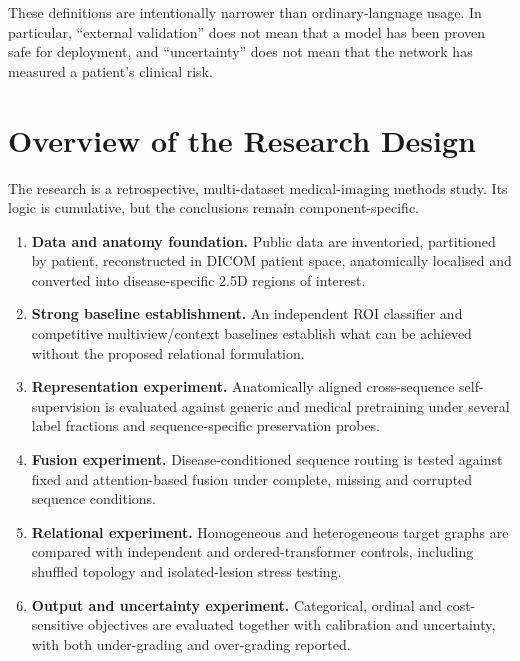 These definitions are intentionally narrower than ordinary-language usage. In
particular, ``external validation'' does not mean that a model has been proven safe
for deployment, and ``uncertainty'' does not mean that the network has measured a
patient's clinical risk.

\section{Overview of the Research Design}
\label{sec:intro-design-overview}

The research is a retrospective, multi-dataset medical-imaging methods study. Its
logic is cumulative, but the conclusions remain component-specific.

\begin{enumerate}
  \item \textbf{Data and anatomy foundation.} Public data are inventoried,
        partitioned by patient, reconstructed in DICOM patient space, anatomically
        localised and converted into disease-specific 2.5D regions of interest.

  \item \textbf{Strong baseline establishment.} An independent ROI classifier and
        competitive multiview/context baselines establish what can be achieved
        without the proposed relational formulation.

  \item \textbf{Representation experiment.} Anatomically aligned cross-sequence
        self-supervision is evaluated against generic and medical pretraining under
        several label fractions and sequence-specific preservation probes.

  \item \textbf{Fusion experiment.} Disease-conditioned sequence routing is tested
        against fixed and attention-based fusion under complete, missing and
        corrupted sequence conditions.

  \item \textbf{Relational experiment.} Homogeneous and heterogeneous target graphs
        are compared with independent and ordered-transformer controls, including
        shuffled topology and isolated-lesion stress testing.

  \item \textbf{Output and uncertainty experiment.} Categorical, ordinal and
        cost-sensitive objectives are evaluated together with calibration and
        uncertainty, with both under-grading and over-grading reported.


\end{enumerate}
